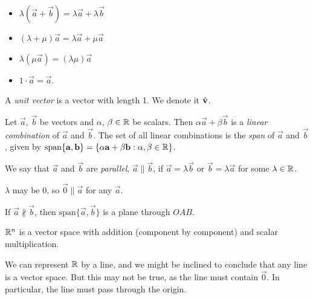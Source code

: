\documentclass{../template/note}
\begin{document}
\begin{definition}
\begin{enumerate}[label=\protect\circled{\arabic*}]
            \begin{itemize}
                \item \(\lambda(\vec a + \vec b) = \lambda \vec a + \lambda \vec b\)
                \item \((\lambda + \mu)\vec a = \lambda \vec a + \mu \vec a\)
                \item \(\lambda(\mu \vec a) = (\lambda \mu)\vec a\)
                \item \(1 \cdot \vec a = \vec a\).
            \end{itemize}
            
            
            
            
            
        \end{enumerate}
    \end{definition}
    
    \begin{definition}
        A \emph{unit vector} is a vector with length 1. We denote it \(\hvec v\).
    \end{definition}
    
    \begin{definition}
        Let \(\vec a\), \(\vec b\) be vectors and \(\alpha\), \(\beta \in \mathbb R\) be scalars. Then \(\alpha \vec a + \beta \vec b\) is a \emph{linear combination} of \(\vec a\) and \(\vec b\). The set of all linear combinations is the \emph{span} of \(\vec a\) and \(\vec b\), given by \(\mathrm{span}\{\vec a, \vec b\} = \{\alpha \vec a + \beta \vec b: \alpha, \beta \in \RR\}\).
    \end{definition}
    
    \begin{definition}
        We say that \(\vec a\) and \(\vec b\) are \emph{parallel}, \(\vec a \parallel \vec b\), if \(\vec a = \lambda \vec b\) or \(\vec b = \lambda \vec a\) for some \(\lambda \in \mathbb R\).
    \end{definition}
    
    \begin{remark}
        \(\lambda\) may be 0, so \(\vec 0 \parallel \vec a\) for any \(\vec a\).
    \end{remark}
    
    If \(\vec a \nparallel \vec b\), then \(\mathrm{span}\{\vec a, \vec b\}\) is a plane through \(OAB\).

    \begin{example}
        \(\mathbb R^n\) is a vector space with addition (component by component) and scalar multiplication.

        We can represent \(\mathbb R\) by a line, and we might be inclined to conclude that any line is a vector space. But this may not be true, as the line must contain \(\vec 0\). In particular, the line must pass through the origin.
    \end{example}
    
\end{document}
